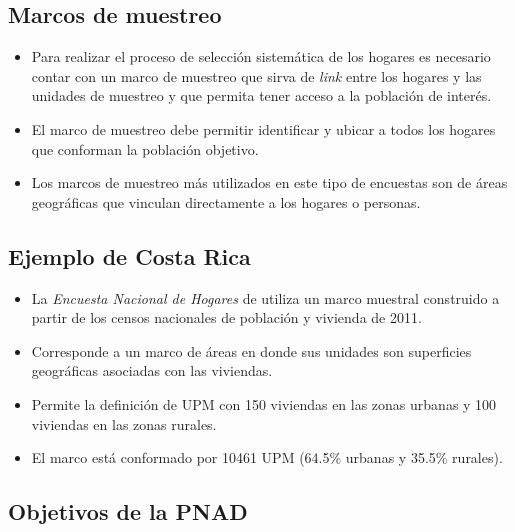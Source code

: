 \documentclass[
]{article}
\providecommand{\tightlist}{%
  \setlength{\itemsep}{0pt}\setlength{\parskip}{0pt}}
\begin{document}
\hypertarget{marcos-de-muestreo}{%
\subsection{Marcos de muestreo}\label{marcos-de-muestreo}}

\begin{itemize}
\tightlist
\item
  Para realizar el proceso de selección sistemática de los hogares es
  necesario contar con un marco de muestreo que sirva de \emph{link}
  entre los hogares y las unidades de muestreo y que permita tener
  acceso a la población de interés.
\item
  El marco de muestreo debe permitir identificar y ubicar a todos los
  hogares que conforman la población objetivo.
\item
  Los marcos de muestreo más utilizados en este tipo de encuestas son de
  áreas geográficas que vinculan directamente a los hogares o personas.
\end{itemize}

\hypertarget{ejemplo-de-costa-rica}{%
\subsection{Ejemplo de Costa Rica}\label{ejemplo-de-costa-rica}}

\begin{itemize}
\tightlist
\item
  La \emph{Encuesta Nacional de Hogares} de utiliza un marco muestral
  construido a partir de los censos nacionales de población y vivienda
  de 2011.
\item
  Corresponde a un marco de áreas en donde sus unidades son superficies
  geográficas asociadas con las viviendas.
\item
  Permite la definición de UPM con 150 viviendas en las zonas urbanas y
  100 viviendas en las zonas rurales.
\item
  El marco está conformado por 10461 UPM (64.5\% urbanas y 35.5\%
  rurales).
\end{itemize}

\hypertarget{objetivos-de-la-pnad}{%
\subsection{Objetivos de la PNAD}\label{objetivos-de-la-pnad}}
\end{document}
